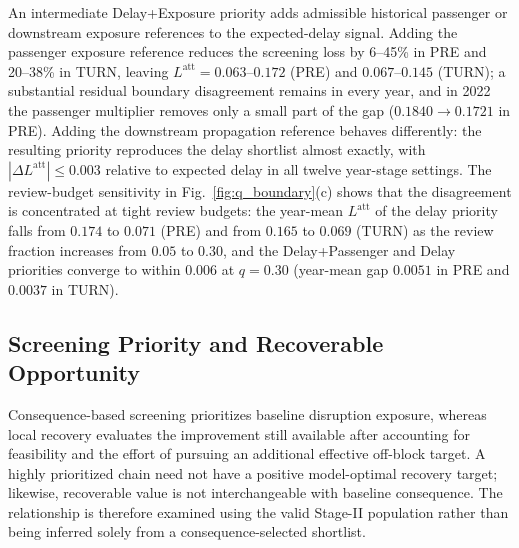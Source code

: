 An intermediate Delay+Exposure priority adds admissible historical passenger or downstream exposure references to the expected-delay signal. Adding the passenger exposure reference reduces the screening loss by 6--45\% in PRE and 20--38\% in TURN, leaving $L^{\mathrm{att}}=0.063$--$0.172$ (PRE) and $0.067$--$0.145$ (TURN); a substantial residual boundary disagreement remains in every year, and in 2022 the passenger multiplier removes only a small part of the gap ($0.1840\to0.1721$ in PRE). Adding the downstream propagation reference behaves differently: the resulting priority reproduces the delay shortlist almost exactly, with $|\Delta L^{\mathrm{att}}|\leq0.003$ relative to expected delay in all twelve year-stage settings. The review-budget sensitivity in Fig.~\ref{fig:q_boundary}(c) shows that the disagreement is concentrated at tight review budgets: the year-mean $L^{\mathrm{att}}$ of the delay priority falls from $0.174$ to $0.071$ (PRE) and from $0.165$ to $0.069$ (TURN) as the review fraction increases from $0.05$ to $0.30$, and the Delay+Passenger and Delay priorities converge to within $0.006$ at $q=0.30$ (year-mean gap $0.0051$ in PRE and $0.0037$ in TURN).

\subsection{Screening Priority and Recoverable Opportunity}
\label{subsec:results_local_recovery}

Consequence-based screening prioritizes baseline disruption exposure, whereas local recovery evaluates the improvement still available after accounting for feasibility and the effort of pursuing an additional effective off-block target. A highly prioritized chain need not have a positive model-optimal recovery target; likewise, recoverable value is not interchangeable with baseline consequence. The relationship is therefore examined using the valid Stage-II population rather than being inferred solely from a consequence-selected shortlist.

